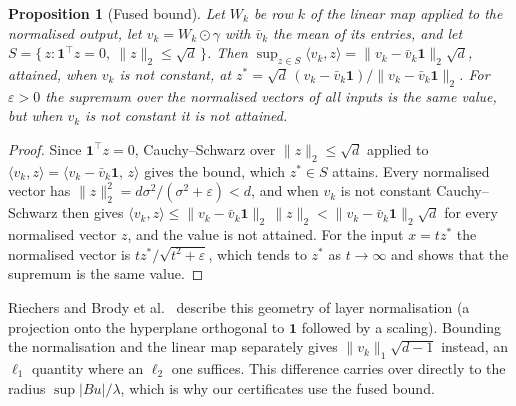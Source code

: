 \documentclass[11pt, a4paper]{article}
\newtheorem{proposition}{Proposition}
\theoremstyle{remark}
\theoremstyle{plain}
\begin{document}
\begin{proposition}[Fused bound]
\label{prop:fused}
Let $W_k$ be row $k$ of the linear map applied to the normalised output, let
$v_k = W_k \odot \gamma$ with $\bar{v}_k$ the mean of its entries, and let
$S = \{\, z : \mathbf{1}^{\top} z = 0,\ \|z\|_2 \le \sqrt{d} \,\}$. Then
$\sup_{z \in S} \langle v_k, z \rangle = \| v_k - \bar{v}_k \mathbf{1} \|_2 \sqrt{d}$, attained,
when $v_k$ is not constant, at
$z^{\ast} = \sqrt{d}\,(v_k - \bar{v}_k \mathbf{1}) / \|v_k - \bar{v}_k \mathbf{1}\|_2$. For
$\varepsilon > 0$ the supremum over the normalised vectors of all inputs is the same value, but
when $v_k$ is not constant it is not attained.
\end{proposition}

\begin{proof}
Since $\mathbf{1}^{\top} z = 0$, Cauchy--Schwarz over $\|z\|_2 \le \sqrt{d}$ applied to
$\langle v_k, z \rangle = \langle v_k - \bar{v}_k \mathbf{1},\, z \rangle$ gives the bound, which
$z^{\ast} \in S$ attains. Every normalised vector has
$\|z\|_2^2 = d\sigma^2/(\sigma^2 + \varepsilon) < d$, and when $v_k$ is not constant
Cauchy--Schwarz then gives
$\langle v_k, z \rangle \le \|v_k - \bar v_k\mathbf{1}\|_2\, \|z\|_2
< \|v_k - \bar v_k\mathbf{1}\|_2 \sqrt{d}$ for every normalised vector $z$, and the value is not
attained. For the input $x = t z^{\ast}$ the normalised vector is
$t z^{\ast}/\sqrt{t^2 + \varepsilon}$, which tends to $z^{\ast}$ as $t \to \infty$ and shows that
the supremum is the same value.
\end{proof}

Riechers \citep{riechers2024layernorm} and Brody et al.\ \citep{brody2023layernorm} describe this
geometry of layer normalisation (a projection onto the hyperplane orthogonal to $\mathbf{1}$
followed by a scaling). Bounding the normalisation and the linear map separately gives
$\|v_k\|_1\sqrt{d-1}$ instead, an $\ell_1$ quantity where an $\ell_2$ one suffices. This
difference carries over directly to the radius $\sup|Bu|/\lambda$, which is why our certificates
use the fused bound.
\end{document}

